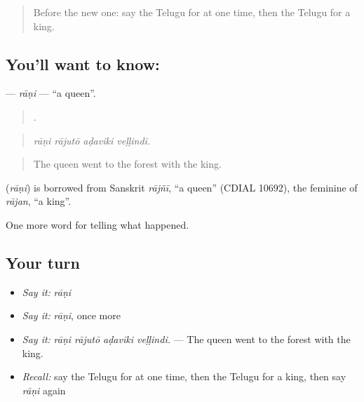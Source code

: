 \label{lesson:TE-C327-rani}



\begin{quote}
Before the new one: say the Telugu for at one time, then the Telugu for a king.
\end{quote}

\subsection*{You'll want to know: }
\textbf{} — \emph{rāṇi} — \textquotedblleft{}a queen\textquotedblright{}.

\begin{quote}
   .
\end{quote}

\begin{quote}
\emph{rāṇi rājutō aḍaviki veḷḷindi.}
\end{quote}

\begin{quote}
The queen went to the forest with the king.
\end{quote}

\begin{cousinweb}
\textbf{} (\emph{rāṇi}) is borrowed from Sanskrit \emph{rājñī}, \textquotedblleft{}a queen\textquotedblright{} (CDIAL 10692), the feminine of \emph{rājan}, \textquotedblleft{}a king\textquotedblright{}.
\end{cousinweb}

\begin{grammarlens}[title={What you've built}]
One more word for telling what happened.
\end{grammarlens}

\subsection*{Your turn}
\begin{itemize}
\raggedright
  \item \emph{Say it:} \emph{rāṇi}
  \item \emph{Say it:} \emph{rāṇi}, once more
  \item \emph{Say it:} \emph{rāṇi rājutō aḍaviki veḷḷindi.} — The queen went to the forest with the king.
  \item \emph{Recall:} say the Telugu for at one time, then the Telugu for a king, then say \emph{rāṇi} again
\end{itemize}

